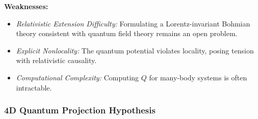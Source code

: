 \documentclass[12pt]{article}
\begin{document}
\textbf{Weaknesses:}
\begin{itemize}
    \item \emph{Relativistic Extension Difficulty:} Formulating a Lorentz-invariant Bohmian theory consistent with quantum field theory remains an open problem.
    \item \emph{Explicit Nonlocality:} The quantum potential violates locality, posing tension with relativistic causality.
    \item \emph{Computational Complexity:} Computing $Q$ for many-body systems is often intractable.
\end{itemize}

\subsubsection*{4D Quantum Projection Hypothesis}
\end{document}
